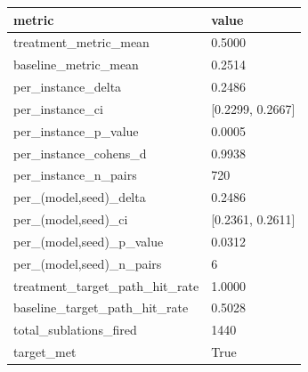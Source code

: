 {\def\LTcaptype{none} %
\begin{longtable}[]{@{}ll@{}}
\toprule\noalign{}
metric & value \\
\midrule\noalign{}
\endhead
\bottomrule\noalign{}
\endlastfoot
treatment\_metric\_mean & 0.5000 \\
baseline\_metric\_mean & 0.2514 \\
per\_instance\_delta & 0.2486 \\
per\_instance\_ci & {[}0.2299, 0.2667{]} \\
per\_instance\_p\_value & 0.0005 \\
per\_instance\_cohens\_d & 0.9938 \\
per\_instance\_n\_pairs & 720 \\
per\_(model,seed)\_delta & 0.2486 \\
per\_(model,seed)\_ci & {[}0.2361, 0.2611{]} \\
per\_(model,seed)\_p\_value & 0.0312 \\
per\_(model,seed)\_n\_pairs & 6 \\
treatment\_target\_path\_hit\_rate & 1.0000 \\
baseline\_target\_path\_hit\_rate & 0.5028 \\
total\_sublations\_fired & 1440 \\
target\_met & True \\
\end{longtable}
}
